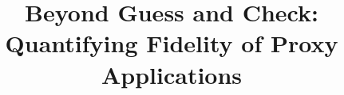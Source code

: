 \documentclass[conference]{IEEEtran}
\newcommand{\commentout}[1]{}
\begin{document}
\title{\Large \bf Beyond Guess and Check: Quantifying Fidelity of Proxy Applications\\

}

\commentout{ %
\author{\IEEEauthorblockN{1\textsuperscript{st} Si Chen}
\IEEEauthorblockA{
\textit{Emory University}\\
Atlanta, GA, USA \\
si.chen2@emory.edu}
\and
\IEEEauthorblockN{2\textsuperscript{nd} Omar Aaziz}
\IEEEauthorblockA{
\textit{Sandia National Laboratories}\\
Albuquerque,New Mexico,USA\\
oaaziz@sandia.gov}
\and
\IEEEauthorblockN{3\textsuperscript{rd} Jeanine Cook}
\IEEEauthorblockA{
\textit{Sandia National Laboratories}\\
Albuquerque,New Mexico,USA\\
jeacook@sandia.gov}
\and
\IEEEauthorblockN{4\textsuperscript{th} Jonathan Cook}
\IEEEauthorblockA{
\textit{New Mexico State University}\\
\\
joncook@nmsu.edu}
\and
\IEEEauthorblockN{5\textsuperscript{th}Courtenay Vaughan }
\IEEEauthorblockA{
\textit{Sandia National Laboratories}\\
Albuquerque,New Mexico,USA\\
ctvaugh@sandia.gov}
\and
\IEEEauthorblockN{6\textsuperscript{th} Avani Wildani}
\IEEEauthorblockA{
\textit{Emory University}\\
Atlanta, GA, USA\\
avani@mathcs.emory.edu}
}
}%
\maketitle
\end{document}

